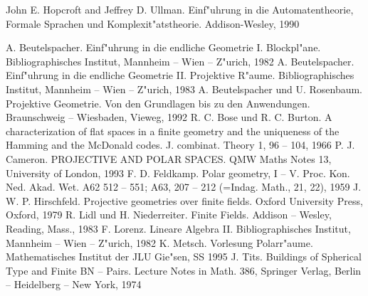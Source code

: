 \begin{thebibliography}{99}
 John E. Hopcroft and Jeffrey D. Ullman. Einf"uhrung in die Automatentheorie, Formale Sprachen und Komplexit"atstheorie. Addison-Wesley, 1990



 A. Beutelspacher. Einf"uhrung in die endliche 
Geometrie I. Blockpl"ane. Bibliographisches Institut, Mannheim --
Wien -- Z"urich, 1982
 A. Beutelspacher. Einf"uhrung in die endliche 
Geometrie II. Projektive R"aume. Bibliographisches Institut, Mannheim --
Wien -- Z"urich, 1983
 A. Beutelspacher und U. Rosenbaum. Projektive Geometrie. 
Von den Grundlagen bis zu den Anwendungen. Braunschweig -- Wiesbaden, 
Vieweg, 1992
 R. C. Bose und R. C. Burton. A characterization of flat spaces in a
finite geometry and the uniqueness of the Hamming and the McDonald codes.
J. combinat. Theory 1, 96 -- 104, 1966
 P. J. Cameron. PROJECTIVE AND POLAR SPACES. QMW Maths Notes 13,
University of London, 1993
 F. D. Feldkamp. Polar geometry, I -- V. Proc. Kon. Ned. Akad. Wet.
A62 512 -- 551; A63, 207 -- 212 (=Indag. Math., 21, 22), 1959
 J. W. P. Hirschfeld. Projective geometries over finite fields.
Oxford University Press, Oxford, 1979
 R. Lidl und H. Niederreiter. Finite Fields. Addison -- Wesley,
Reading, Mass., 1983
 F. Lorenz. Lineare Algebra II. Bibliographisches Institut,
Mannheim -- Wien -- Z"urich, 1982
 K. Metsch. Vorlesung Polarr"aume. Mathematisches Institut der
JLU Gie"sen, SS 1995
 J. Tits. Buildings of Spherical Type and Finite BN -- Pairs.
Lecture Notes in Math. 386, Springer Verlag, Berlin -- Heidelberg -- New York,
1974
\end{thebibliography}
